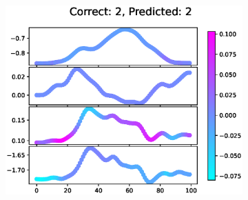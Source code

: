 \begin{figure}[h]
\begin{subfigure}[t]{0.32\textwidth}
    \includegraphics[width=\textwidth]{files/figs/res/femval/gradcam/22.eps}
    \caption{}
    \label{fig:femval-22}
  \end{subfigure}


\end{figure}

